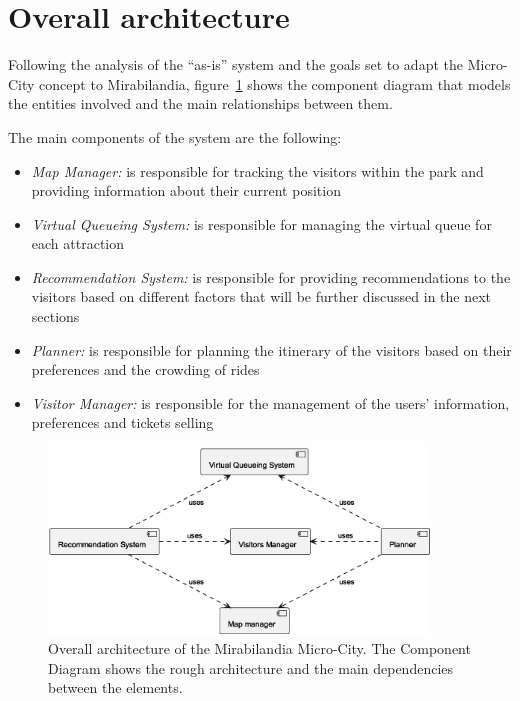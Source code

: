 \section{Overall architecture}\label{sec:mira-microcity}
Following the analysis of the ``as-is'' system and the goals set to adapt the Micro-City concept to Mirabilandia,
figure~\ref{fig:architecture-overview} shows the component diagram that models the entities involved and the main relationships between them.

The main components of the system are the following:

\begin{itemize}
	\item \textit{Map Manager:} is responsible for tracking the visitors within the park and providing information about their current position
	\item \textit{Virtual Queueing System:} is responsible for managing the virtual queue for each attraction
	\item \textit{Recommendation System:} is responsible for providing recommendations to the visitors based on different factors that will be further discussed in the next sections
	\item \textit{Planner:} is responsible for planning the itinerary of the visitors based on their preferences and the crowding of rides
	\item \textit{Visitor Manager:} is responsible for the management of the users' information, preferences and tickets selling
\end{itemize}

\begin{figure}[H]
	\centering
	\includegraphics[width=0.9\textwidth]{img/architecture-overview.eps}
	\caption{Overall architecture of the Mirabilandia Micro-City.
		The Component Diagram shows the rough architecture and the main dependencies between the elements.
	}
	\label{fig:architecture-overview}
\end{figure}

